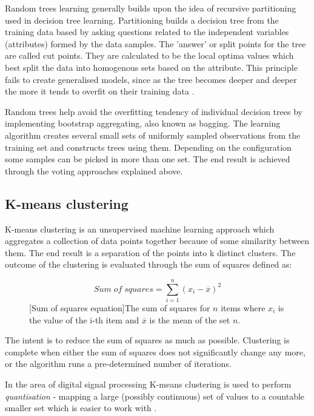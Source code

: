 Random trees learning generally builds upon the idea of recursive partitioning
used in decision tree learning. Partitioning builds a decision tree from the
training data based by asking questions related to the independent variables
(attributes) formed by the data samples. The 'answer' or split points for the
tree are called cut points. They are calculated to be the local optima values
which best split the data into homogenous sets based on the attribute. This
principle fails to create generalised models, since as the tree becomes deeper
and deeper the more it tends to overfit on their training data
\cite{friedman2001elements}.

Random trees help avoid the overfitting tendency of individual decision trees by
implementing bootstrap aggregating, also known as bagging. The learning
algorithm creates several small sets of uniformly sampled observations from the
training set and constructs trees using them. Depending on the configuration
some samples can be picked in more than one set. The end result is achieved
through the voting approaches explained above.

\subsection{K-means clustering}
\label{subsec:kmeansclustering}
K-means clustering is an unsupervised machine learning approach which aggregates
a collection of data points together because of some similarity between them.
The end result is a separation of the points into k distinct
clusters. The outcome of the clustering is evaluated through the sum of squares
defined as:
\begin{figure}[H]
   \begin{equation}
        Sum\;of\;squares = \sum_{i=1}^{n}(x_i - \overline{x})^2
   \end{equation} 
   [Sum of squares equation]{The sum of squares for $n$ items where $x_i$ is the value of the i-th item and $\overline{x}$ is the mean of the set $n$.}
   \label{fig:sumofsquares}
\end{figure}

The intent is to reduce the sum of squares as much as possible. Clustering is
complete when either the sum of squares does not significantly change any more,
or the algorithm runs a pre-determined number of iterations.

In the area of digital signal processing K-means clustering is used to perform 
\textit{quantisation} - mapping a large (possibly continuous) set of values to a
countable smaller set which is easier to work with \cite{wiki:quantisation}.


